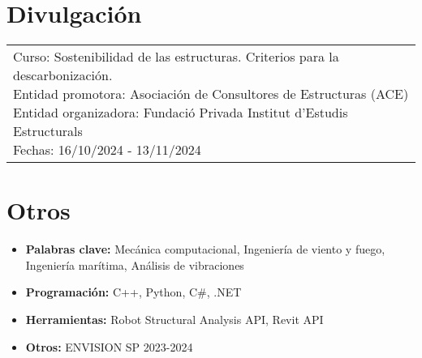 \documentclass[11pt]{article}
\begin{document}
\section{Divulgación}
\begin{tabularx}{\linewidth}{l}
    \parbox{\linewidth}{
        Curso: Sostenibilidad de las estructuras. Criterios para la descarbonización. \\
        Entidad promotora: Asociación de Consultores de Estructuras (ACE) \\
        Entidad organizadora: Fundació Privada Institut d'Estudis Estructurals \\
        Fechas: 16/10/2024 - 13/11/2024
    }
\end{tabularx}


\section{Otros}
\begin{itemize}
    \itemsep=-.3em
    \item \textbf{Palabras clave:} Mecánica computacional, Ingeniería de viento y fuego, Ingeniería marítima, Análisis de vibraciones
    \item \textbf{Programación:} C++, Python, C\#, .NET
    \item \textbf{Herramientas:} Robot Structural Analysis API, Revit API
    \item \textbf{Otros:} ENVISION SP 2023-2024
\end{itemize}
\end{document}
